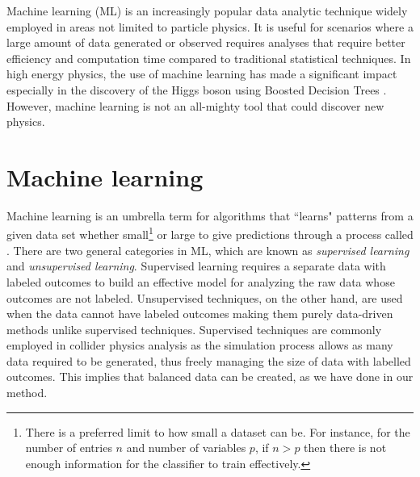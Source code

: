 Machine learning (ML) is an increasingly popular data analytic technique widely employed in areas not limited to particle physics. It is useful for scenarios where a large amount of data generated or observed requires analyses that require better efficiency and computation time compared to traditional statistical techniques. In high energy physics, the use of machine learning has made a significant impact especially in the discovery of the Higgs boson using Boosted Decision Trees \cite{chatrchyan2012observation, aad2012observation, chen2015higgs}. However, machine learning is not an all-mighty tool that could discover new physics. \\


\section{Machine learning}
Machine learning is an umbrella term for algorithms that ``learns" patterns from a given data set whether small\footnote{There is a preferred limit to how small a dataset can be. For instance, for the number of entries $n$ and number of variables $p$, if $n>p$ then there is not enough information for the classifier to train effectively.} or large to give predictions through a process called . There are two general categories in ML, which are known as \textit{supervised learning} and \textit{unsupervised learning}. Supervised learning requires a separate data with labeled outcomes to build an effective model for analyzing the raw data whose outcomes are not labeled. Unsupervised techniques, on the other hand, are used when the data cannot have labeled outcomes making them purely data-driven methods unlike supervised techniques. Supervised techniques are commonly employed in collider physics analysis as the simulation process allows as many data required to be generated, thus freely managing the size of data with labelled outcomes. This implies that balanced data can be created, as we have done in our method. \\

